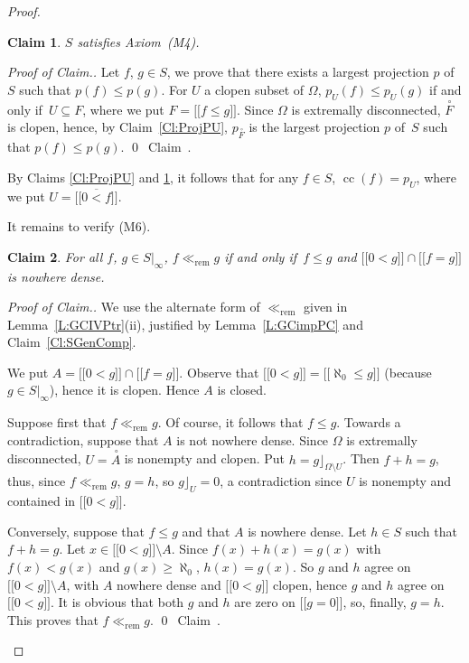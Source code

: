\documentclass[psamsfonts,reqno]{memo-l}
\theoremstyle{plain}
\newtheorem{claim}{Claim}
\theoremstyle{definition}
\theoremstyle{remark}
\newcommand{\qedc}{{\qed}~{\rm Claim~{\theclaim}.}}
\newenvironment{cproof}
{\begin{proof}[Proof of Claim.]}
{\qedc\renewcommand{\qed}{}\end{proof}}
\numberwithin{equation}{section}
\renewcommand{\iff}{if and only if}
\newcommand{\oll}[1]{\overline{#1}}
\newcommand{\rem}{\ll_{\mathrm{rem}}}
\newcommand{\DI}[1]{#1|_{\infty}}
\newcommand{\vbv}[1]{{[\![}#1{]\!]}}
\DeclareMathOperator{\cc}{cc}
\begin{document}
\begin{proof}
\begin{claim}\label{Cl:Compbvfleg}
$S$ satisfies Axiom~\textup{(M4)}.
\end{claim}

\begin{cproof}
Let $f$, $g\in S$, we prove that there exists a largest projection $p$ of
$S$ such that $p(f)\leq p(g)$. For $U$ a clopen subset of
$\Omega$, $p_U(f)\leq p_U(g)$ \iff\ $U\subseteq F$, where we put
$F=\vbv{f\leq g}$. Since $\Omega$ is extremally
disconnected, $\overset{\,\circ}{F}$ is clopen, hence, by
Claim~\ref{Cl:ProjPU}, $p_{\overset{\,\circ}{F}}$ is the largest projection
$p$ of~$S$ such that $p(f)\leq p(g)$.
\end{cproof}

By Claims \ref{Cl:ProjPU} and \ref{Cl:Compbvfleg}, it follows that
for any $f\in S$, $\cc(f)=p_U$, where we put $U=\oll{\vbv{0<f}}$.

It remains to verify (M6).

\begin{claim}\label{Cl:Charrem}
For all $f$, $g\in\DI{S}$, $f\rem g$ \iff\ $f\leq g$ and\linebreak
$\vbv{0<g}\cap\vbv{f=g}$ is nowhere dense.
\end{claim}

\begin{cproof}
We use the alternate form of $\rem$ given in Lemma~\ref{L:GCIVPtr}(ii),
justified by Lemma~\ref{L:GCimpPC} and Claim~\ref{Cl:SGenComp}.

We put $A=\vbv{0<g}\cap\vbv{f=g}$. Observe that
$\vbv{0<g}=\vbv{\aleph_0\leq g}$ (because $g\in\DI{S}$), hence it is
clopen. Hence $A$ is closed.

Suppose first that $f\rem g$. Of course, it follows that $f\leq g$.
Towards a contradiction, suppose that $A$ is
not nowhere dense. Since $\Omega$ is extremally disconnected,
$U=\overset{\,\circ}{A}$ is nonempty and clopen. Put
$h=g\rfloor_{\Omega\setminus U}$. Then $f+h=g$, thus, since $f\rem g$, $g=h$,
so $g\rfloor_U=0$, a contradiction since $U$ is nonempty and contained in
$\vbv{0<g}$.

Conversely, suppose that $f\leq g$ and that
$A$ is nowhere dense. Let $h\in S$ such that
$f+h=g$. Let $x\in\vbv{0<g}\setminus A$. Since $f(x)+h(x)=g(x)$ with
$f(x)<g(x)$ and $g(x)\geq\aleph_0$, $h(x)=g(x)$. So $g$ and $h$ agree on
$\vbv{0<g}\setminus A$, with $A$ nowhere dense and $\vbv{0<g}$ clopen, hence
$g$ and $h$ agree on $\vbv{0<g}$. It is obvious that both $g$ and $h$ are
zero on $\vbv{g=0}$, so, finally, $g=h$. This proves that $f\rem g$.
\end{cproof}


\end{proof}
\end{document}
